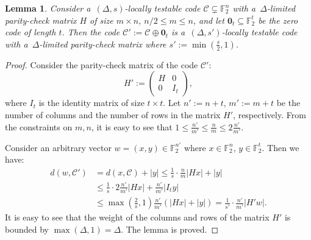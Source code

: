\documentclass[conference]{IEEEtran}
\let\le\leqslant
\theoremstyle{plain}
\newtheorem{lemma}[theorem]{Lemma}
\theoremstyle{definition}
\theoremstyle{remark}
\newcommand{\cC}{\mathcal{C}}
\newcommand{\F}{\mathbb{F}}
\begin{document}
\begin{lemma}\label{lemma:pad-LTC}
    Consider a~$(\Delta,s)$-locally testable code $\cC \subsetneq \F_2^{n}$ with a~$\Delta$-limited parity-check matrix $H$ of size $m \times n$, $n/2 \le m \le n$, and let $\mathbf{0}_t \subseteq \F_2^t$ be the zero code of length $t$. Then the code $\cC' := \cC \oplus \mathbf{0}_t$ is a~$(\Delta, s')$-locally testable code with a~$\Delta$-limited parity-check matrix where $s':=\min(\frac{s}{2}, 1)$.
\end{lemma}
\begin{proof}
    Consider the parity-check matrix of the code $\cC'$:
    \[
    H' := \begin{pmatrix}
        H & 0 \\ 0 & I_t
    \end{pmatrix},
    \]
    where $I_t$ is the identity matrix of size $t \times t$. 
    Let $n' := n + t$, $m' := m + t$ be the number of columns and the number of rows in the matrix $H'$, respectively.
    From the constraints on $m, n$, it is easy to see that $1 \le \frac{n'}{m'} \le \frac{n}{m} \le 2 \frac{n'}{m'}$.
   
    Consider an arbitrary vector $w = (x, y) \in \F_2^{n'}$ where ${x \in \F_2^{n}}$, $y \in \F_2^t$. 
    Then we have:
    \begin{align*}
        d(w, \cC') &= d(x, \cC) + |y| 
        \le \frac{1}{s} \cdot \frac{n}{m} |H x| + |y| \\
        &\le \frac{1}{s} \cdot 2 \frac{n'}{m'} |H x| + \frac{n'}{m'} |I_t y| \\
        &\le \max \left( \frac{2}{s}, 1 \right) \frac{n'}{m'} (|H x| + |y|) 
        = \frac{1}{s'} \cdot \frac{n'}{m'} |H' w|.
    \end{align*}
    It is easy to see that the weight of the columns and rows of the matrix $H'$ is bounded by $\max(\Delta, 1) = \Delta$.
    The lemma is proved.
\end{proof}
\end{document}
